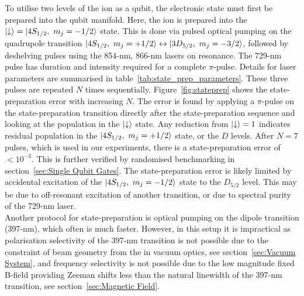     To utilise two levels of the ion as a qubit, the electronic state must first be prepared into the qubit manifold. Here, the ion is prepared into the $\ket{\downarrow}=\ket{4S_{1/2},~m_j=-1/2}$ state. 
    This is done via pulsed optical pumping on the quadrupole transition $\ket{4S_{1/2},~m_j = +1/2} \leftrightarrow \ket{3D_{5/2},~m_j = -3/2}$,
    followed by deshelving pulses using the 854-nm, 866-nm
    lasers on resonance.  The 729-nm pulse has duration and intensity required for a complete $\pi$-pulse. Details for laser parameters are summarised in table~\ref{tab:state_prep_parameters}. These three pulses are repeated $N$ times sequentially. Figure~\ref{fig:stateprep} shows the state-preparation error with increasing $N$. The error is found by applying a $\pi$-pulse on the state-preparation transition directly after the state-preparation sequence and looking at the population in the $\ket{\downarrow}$ state. Any reduction from $\ket{\downarrow} = 1$ indicates residual population in the $\ket{4S_{1/2},~m_j = +1/2}$ state, or the $D$ levels. After $N=7$ pulses, which is used in our experiments, there is a state-preparation error of $<10^{-3}$. This is further verified by randomised benchmarking in section~\ref{sec:Single Qubit Gates}. The state-preparation error is likely limited by accidental excitation of the $\ket{4S_{1/2},~m_j = -1/2}$ state to the $D_{5/2}$ level. This may be due to off-resonant excitation of another transition, or due to spectral purity of the 729-nm laser. \\
    Another protocol for state-preparation is optical pumping on the dipole transition (397-nm), which often is much faster. However, in this setup it is impractical as polarisation selectivity of the 397-nm transition is not possible due to 
    the constraint of beam geometry from the in vacuum optics, see section~\ref{sec:Vacuum System},
    and frequency selectivity is not possible due to the low magnitude fixed B-field providing Zeeman shifts less than the natural linewidth of the 397-nm transition, see section~\ref{sec:Magnetic Field}. 


